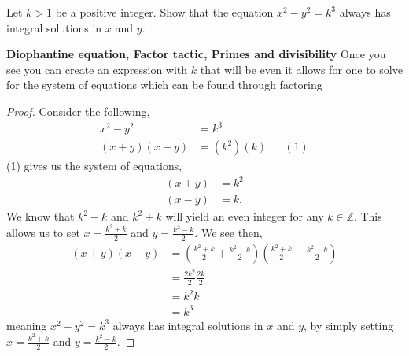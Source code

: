 \documentclass[11pt]{article}
\newenvironment{problem}[2][Problem\!]{\begin{trivlist}
\item[\hskip \labelsep {\bfseries #1}\hskip \labelsep {\bfseries #2}]}{\end{trivlist}}
\newcommand{\zz}{\mathbb Z}   %
\begin{document}
\begin{tcolorbox}
    \begin{problem} {IC | 12-03 | PP 42}
      Let $k > 1$ be a positive integer. Show that the equation $x^{2} -y^{2} = k^{3}$
  always has integral solutions in $x$ and $y$.
    \end{problem}
    \textbf{Diophantine equation, Factor tactic, Primes and divisibility} Once you see you can create an expression with $k$ that will be even it allows for one to solve for the system of equations which can be found through factoring
  \end{tcolorbox}
  \begin{proof}
      Consider the following,
      \begin{align*}
          x^{2} - y^{2} &= k^{3} \\
          (x+y)(x-y) &= (k^{2})(k) && (1)
      \end{align*}
      (1) gives us the system of equations,
      \begin{align*}
          (x+y) &= k^{2} \\
          (x-y) &= k.
      \end{align*}
      We know that $k^{2} - k$ and $k^{2} +k $ will yield an even integer for any $k \in \zz$. This allows us to set $x = \frac{k^{2} + k}{2}$ and $y = \frac{k^{2} - k}{2}$. We see then,
      \begin{align*}
          (x+y)(x-y) &= (\frac{k^{2} + k}{2} + \frac{k^{2} - k}{2})(\frac{k^{2} + k}{2} -\frac{k^{2} - k}{2}) \\
          &= \frac{2k^{2}}{2}\frac{2k}{2} \\
          &= k^{2}k\\
          &= k^{3}
      \end{align*}
      meaning $x^{2}-y^{2} = k^{3}$ always has integral solutions in $x$ and $y$, by simply setting $x = \frac{k^{2} + k}{2}$ and $y = \frac{k^{2} - k}{2}$.
    \end{proof}

\end{document}
